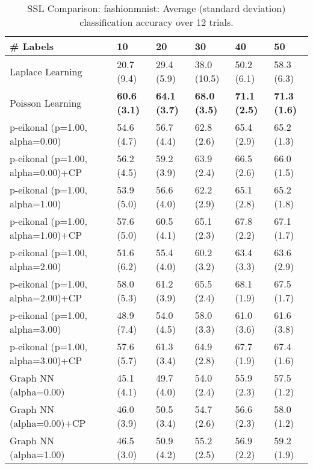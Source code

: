\documentclass{article}
\begin{document}
\begin{table*}[t!]
\vspace{-3mm}
\caption{SSL Comparison: fashionmnist: Average (standard deviation) classification accuracy over 12 trials.}
\vspace{-3mm}
\label{tab:SSL Comparison: fashionmnist}
\vskip 0.15in
\begin{center}
\begin{small}
\begin{sc}
\begin{tabular}{llllll}
\toprule
\# Labels&\textbf{10}&\textbf{20}&\textbf{30}&\textbf{40}&\textbf{50}\\
\midrule
Laplace Learning&20.7 (9.4)      &29.4 (5.9)      &38.0 (10.5)      &50.2 (6.1)      &58.3 (6.3)      \\
Poisson Learning&{\bf 60.6 (3.1)}&{\bf 64.1 (3.7)}&{\bf 68.0 (3.5)}&{\bf 71.1 (2.5)}&{\bf 71.3 (1.6)}\\
p-eikonal (p=1.00, alpha=0.00)&54.6 (4.7)      &56.7 (4.4)      &62.8 (2.6)      &65.4 (2.9)      &65.2 (1.3)      \\
p-eikonal (p=1.00, alpha=0.00)+CP&56.2 (4.5)      &59.2 (3.9)      &63.9 (2.4)      &66.5 (2.6)      &66.0 (1.5)      \\
p-eikonal (p=1.00, alpha=1.00)&53.9 (5.0)      &56.6 (4.0)      &62.2 (2.9)      &65.1 (2.8)      &65.2 (1.8)      \\
p-eikonal (p=1.00, alpha=1.00)+CP&57.6 (5.0)      &60.5 (4.1)      &65.1 (2.3)      &67.8 (2.2)      &67.1 (1.7)      \\
p-eikonal (p=1.00, alpha=2.00)&51.6 (6.2)      &55.4 (4.0)      &60.2 (3.2)      &63.4 (3.3)      &63.6 (2.9)      \\
p-eikonal (p=1.00, alpha=2.00)+CP&58.0 (5.3)      &61.2 (3.9)      &65.5 (2.4)      &68.1 (1.9)      &67.5 (1.7)      \\
p-eikonal (p=1.00, alpha=3.00)&48.9 (7.4)      &54.0 (4.5)      &58.0 (3.3)      &61.0 (3.6)      &61.6 (3.8)      \\
p-eikonal (p=1.00, alpha=3.00)+CP&57.6 (5.7)      &61.3 (3.4)      &64.9 (2.8)      &67.7 (1.9)      &67.4 (1.6)      \\
Graph NN (alpha=0.00)&45.1 (4.1)      &49.7 (4.0)      &54.0 (2.4)      &55.9 (2.3)      &57.5 (1.2)      \\
Graph NN (alpha=0.00)+CP&46.0 (3.9)      &50.5 (3.4)      &54.7 (2.6)      &56.6 (2.3)      &58.0 (1.2)      \\
Graph NN (alpha=1.00)&46.5 (3.0)      &50.9 (4.2)      &55.2 (2.5)      &56.9 (2.2)      &59.2 (1.9)      \\

\end{tabular}
\end{sc}
\end{small}
\end{center}
\end{table*}
\end{document}
